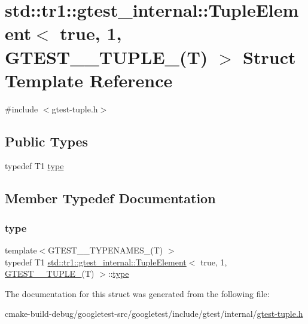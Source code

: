 \hypertarget{structstd_1_1tr1_1_1gtest__internal_1_1TupleElement_3_01true_00_011_00_01GTEST__10__TUPLE___07T_08_01_4}{}\section{std\+::tr1\+::gtest\+\_\+internal\+::Tuple\+Element$<$ true, 1, G\+T\+E\+S\+T\+\_\+\_\+\+T\+U\+P\+L\+E\+\_\+(T) $>$ Struct Template Reference}
\label{structstd_1_1tr1_1_1gtest__internal_1_1TupleElement_3_01true_00_011_00_01GTEST__10__TUPLE___07T_08_01_4}


{\ttfamily \#include $<$gtest-\/tuple.\+h$>$}

\subsection*{Public Types}
\begin{DoxyCompactItemize}
\item 
typedef T1 \mbox{\hyperlink{structstd_1_1tr1_1_1gtest__internal_1_1TupleElement_3_01true_00_011_00_01GTEST__10__TUPLE___07T_08_01_4_a485ca13c9a68cc87072ef1592f97665e}{type}}
\end{DoxyCompactItemize}


\subsection{Member Typedef Documentation}
\mbox{\label{structstd_1_1tr1_1_1gtest__internal_1_1TupleElement_3_01true_00_011_00_01GTEST__10__TUPLE___07T_08_01_4_a485ca13c9a68cc87072ef1592f97665e}} 
\subsubsection{\texorpdfstring{type}{type}}
{\footnotesize\ttfamily template$<$G\+T\+E\+S\+T\+\_\+\_\+\+T\+Y\+P\+E\+N\+A\+M\+E\+S\+\_\+(\+T) $>$ \\
typedef T1 \mbox{\hyperlink{structstd_1_1tr1_1_1gtest__internal_1_1TupleElement}{std\+::tr1\+::gtest\+\_\+internal\+::\+Tuple\+Element}}$<$ true, 1, \mbox{\hyperlink{namespacestd_1_1tr1_aa636d3269bf1f368a7bc09ff158bc482}{G\+T\+E\+S\+T\+\_\+\_\+\+T\+U\+P\+L\+E\+\_\+}}(T) $>$\+::\mbox{\hyperlink{structstd_1_1tr1_1_1gtest__internal_1_1TupleElement_3_01true_00_011_00_01GTEST__10__TUPLE___07T_08_01_4_a485ca13c9a68cc87072ef1592f97665e}{type}}}



The documentation for this struct was generated from the following file\+:\begin{DoxyCompactItemize}
\item 
cmake-\/build-\/debug/googletest-\/src/googletest/include/gtest/internal/\mbox{\hyperlink{gtest-tuple_8h}{gtest-\/tuple.\+h}}\end{DoxyCompactItemize}
